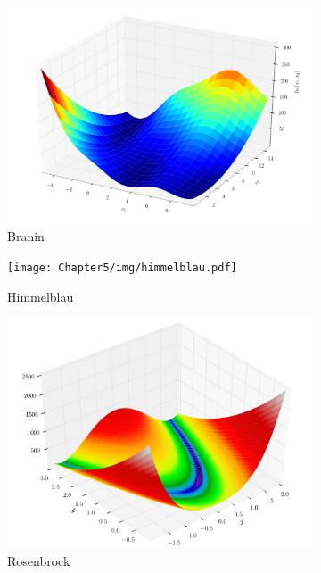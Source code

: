 \begin{figure}[ht]
  \centering
  \begin{subfigure}{0.33\textwidth}
    \centering\includegraphics[width=\textwidth]{Chapter5/img/branin.pdf}
    \caption{Branin}
  \end{subfigure}
  \begin{subfigure}{0.33\textwidth}
    \centering\texttt{[image: Chapter5/img/himmelblau.pdf]}
    \caption{Himmelblau}
  \end{subfigure}
  \begin{subfigure}{0.33\textwidth}
    \centering\includegraphics[width=\textwidth]{Chapter5/img/rosenbrock.pdf}
    \caption{Rosenbrock}
  \end{subfigure}
  \begin{subfigure}{0.33\textwidth}

\end{subfigure}
\end{figure}
